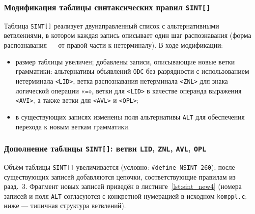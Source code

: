 \documentclass[a4paper,14pt]{extarticle}
\begin{document}
\subsubsection*{Модификация таблицы синтаксических правил \texttt{SINT[]}}

Таблица \texttt{SINT[]} реализует двунаправленный список с альтернативными
ветвлениями, в котором каждая запись описывает один шаг распознавания (форма
распознавания — от правой части к нетерминалу). В ходе модификации:

\begin{itemize}
  \item размер таблицы увеличен; добавлены записи, описывающие новые
        ветки грамматики: альтернативы объявлений \texttt{ODC} без разрядности
        с использованием нетерминала \texttt{<LID>}, ветка распознавания
        нетерминала \texttt{<ZNL>} для знака логической операции «\texttt{=}»,
        ветки для \texttt{<LID>} в качестве операнда выражения \texttt{<AVI>},
        а также ветки для \texttt{<AVL>} и \texttt{<OPL>};
  \item в существующих записях изменены поля альтернативы \texttt{ALT}
        для обеспечения перехода к новым веткам грамматики.
\end{itemize}

\subsubsection*{Дополнение таблицы \texttt{SINT[]}: ветви \texttt{LID}, \texttt{ZNL}, \texttt{AVL}, \texttt{OPL}}

Объём таблицы \texttt{SINT[]} увеличивается (условно: \texttt{\#define NSINT~260}); после существующих записей добавляются цепочки,
соответствующие правилам из разд.~3. Фрагмент новых записей приведён в листинге~\ref{lst:sint_new4} (номера записей и поля \texttt{ALT}
согласуются с конкретной нумерацией в исходном \texttt{komppl.c}; ниже — типичная структура ветвлений).
\end{document}
